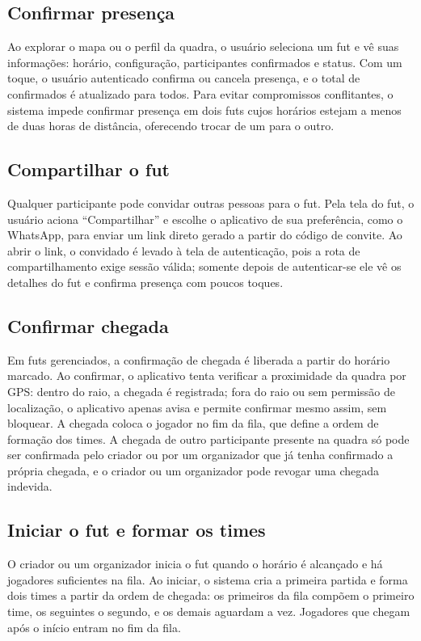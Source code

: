     \subsection{Confirmar presença}
      Ao explorar o mapa ou o perfil da quadra, o usuário seleciona um fut e vê suas informações: horário, configuração, participantes confirmados e status. Com um toque, o usuário autenticado confirma ou cancela presença, e o total de confirmados é atualizado para todos. Para evitar compromissos conflitantes, o sistema impede confirmar presença em dois futs cujos horários estejam a menos de duas horas de distância, oferecendo trocar de um para o outro.

    \subsection{Compartilhar o fut}
      Qualquer participante pode convidar outras pessoas para o fut. Pela tela do fut, o usuário aciona “Compartilhar” e escolhe o aplicativo de sua preferência, como o WhatsApp, para enviar um link direto gerado a partir do código de convite. Ao abrir o link, o convidado é levado à tela de autenticação, pois a rota de compartilhamento exige sessão válida; somente depois de autenticar-se ele vê os detalhes do fut e confirma presença com poucos toques.

    \subsection{Confirmar chegada}
      Em futs gerenciados, a confirmação de chegada é liberada a partir do horário marcado. Ao confirmar, o aplicativo tenta verificar a proximidade da quadra por GPS: dentro do raio, a chegada é registrada; fora do raio ou sem permissão de localização, o aplicativo apenas avisa e permite confirmar mesmo assim, sem bloquear. A chegada coloca o jogador no fim da fila, que define a ordem de formação dos times. A chegada de outro participante presente na quadra só pode ser confirmada pelo criador ou por um organizador que já tenha confirmado a própria chegada, e o criador ou um organizador pode revogar uma chegada indevida.

    \subsection{Iniciar o fut e formar os times}
      O criador ou um organizador inicia o fut quando o horário é alcançado e há jogadores suficientes na fila. Ao iniciar, o sistema cria a primeira partida e forma dois times a partir da ordem de chegada: os primeiros da fila compõem o primeiro time, os seguintes o segundo, e os demais aguardam a vez. Jogadores que chegam após o início entram no fim da fila.

